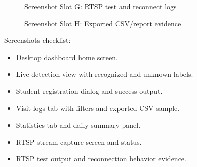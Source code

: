 \documentclass{fisatprojectfinal}
\begin{document}
\begin{appendices}
\begin{figure}[h!]
	\begin{center}
		\fbox{\rule{0pt}{2.8in}\rule{0.88\linewidth}{0pt}}
		\caption{Screenshot Slot G: RTSP test and reconnect logs}
	\end{center}
\end{figure}

\begin{figure}[h!]
	\begin{center}
		\fbox{\rule{0pt}{2.8in}\rule{0.88\linewidth}{0pt}}
		\caption{Screenshot Slot H: Exported CSV/report evidence}
	\end{center}
\end{figure}

Screenshots checklist:
\begin{itemize}
	\item Desktop dashboard home screen.
	\item Live detection view with recognized and unknown labels.
	\item Student registration dialog and success output.
	\item Visit logs tab with filters and exported CSV sample.
	\item Statistics tab and daily summary panel.
	\item RTSP stream capture screen and status.
	\item RTSP test output and reconnection behavior evidence.
\end{itemize}

\end{appendices}
\end{document}
